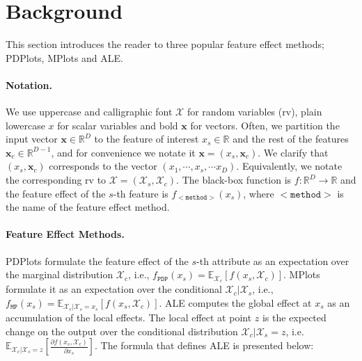 \documentclass[wcp]{jmlr}
\newcommand{\xc}{\mathbf{x}_c} \newcommand{\Xcb}{\mathcal{X}_c}
\newcommand{\xb}{\mathbf{x}} \newcommand{\R}{\mathbb{R}}
\newcommand{\E}{\mathbb{E}} \newcommand{\Jac}{\mathbf{J}}
\begin{document}
\section{Background}
\label{sec:3-feature-effect}

This section introduces the reader to three popular feature effect methods; PDPlots, MPlots and ALE.

\paragraph*{Notation.} We use uppercase and calligraphic font \( \mathcal{X}\) for random variables (rv), plain lowercase \( x \) for scalar variables and bold \( \xb \) for vectors. Often, we partition the input vector \(\xb \in \R^D\) to the feature of interest \(x_s \in \R \) and the rest of the features \(\xc \in \R^{D-1}\), and for convenience we notate it \(\xb = (x_s, \xc)\). We clarify that \((x_s, \xc)\) corresponds to the vector \((x_1, \cdots, x_s, \cdots x_D)\). Equivalently, we notate the corresponding rv to \(\mathcal{X} = (\mathcal{X}_s, \mathcal{X}_c)\). The black-box function is \( f: \R^D \rightarrow \R \) and the feature effect of the \(s\)-th feature is \(f_{\mathtt{<method>}}(x_s)\), where \(\mathtt{<method>}\) is the name of the feature effect method.%

\paragraph{Feature Effect Methods.} PDPlots formulate the feature effect of the \(s\)-th attribute as an expectation over the marginal distribution \(\mathcal{X}_c\), i.e., \(f_{\mathtt{PDP}}(x_s) = \mathbb{\E}_{\mathcal{X}_c}[f(x_s,\mathcal{X}_c)]\). MPlots formulate it as an expectation over the conditional \(\mathcal{X}_c|\mathcal{X}_s\), i.e., \(f_{\mathtt{MP}}(x_s) = \E_{\mathcal{X}_c|\mathcal{X}_s = x_s}[f(x_s, \mathcal{X}_c)]\). ALE computes the global effect at \(x_s\) as an accumulation of the local effects. The local effect at point \(z\) is the expected change on the output over the conditional distribution \(\Xcb|\mathcal{X}_s=z\), i.e.  \( \E_{\Xcb|\mathcal{X}_s=z} \left [ \frac{\partial f(x_s, \mathcal{X}_c)}{\partial x_s} \right] \). The formula that defines ALE is presented below:
\end{document}
